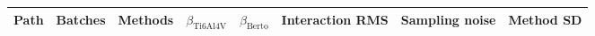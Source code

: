 \begin{tabular}{llrrrrrr}
\hline
Path & Batches & Methods & $\beta_{\mathrm{Ti6Al4V}}$ & $\beta_{\mathrm{Berto}}$ & Interaction RMS & Sampling noise & Method SD \\
\hline
\hline
\end{tabular}
